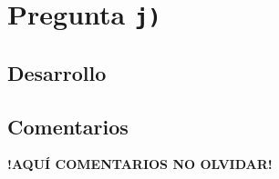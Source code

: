 \section{Pregunta \texttt{j)}}\label{pregunta-j}

\subsection{Desarrollo}



\FloatBarrier
\subsection{Comentarios}


\textbf{!AQUÍ COMENTARIOS NO OLVIDAR!}